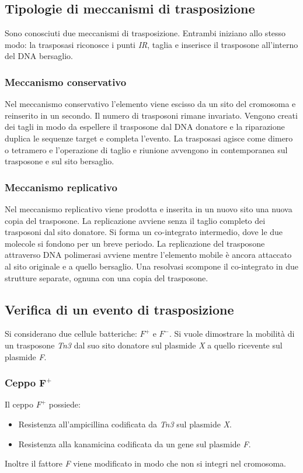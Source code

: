 	\subsection{Tipologie di meccanismi di trasposizione}
	Sono conosciuti due meccanismi di trasposizione.
	Entrambi iniziano allo stesso modo: la trasposasi riconosce i punti \emph{IR}, taglia e inserisce il trasposone all'interno del DNA bersaglio.

		\subsubsection{Meccanismo conservativo}
		Nel meccanismo conservativo l'elemento viene escisso da un sito del cromosoma e reinserito in un secondo.
		Il numero di trasposoni rimane invariato.
		Vengono creati dei tagli in modo da espellere il trasposone dal DNA donatore e la riparazione duplica le sequenze target e completa l'evento.
		La trasposasi agisce come dimero o tetramero e l'operazione di taglio e riunione avvengono in contemporanea sul trasposone e sul sito bersaglio.

		\subsubsection{Meccanismo replicativo}
		Nel meccanismo replicativo viene prodotta e inserita in un nuovo sito una nuova copia del trasposone.
		La replicazione avviene senza il taglio completo dei trasposoni dal sito donatore.
		Si forma un co-integrato intermedio, dove le due molecole si fondono per un breve periodo.
		La replicazione del trasposone attraverso DNA polimerasi avviene mentre l'elemento mobile \`e ancora attaccato al sito originale e a quello bersaglio.
		Una resolvasi scompone il co-integrato in due strutture separate, ognuna con una copia del trasposone.

		
	\subsection{Verifica di un evento di trasposizione}
	Si considerano due cellule batteriche: \emph{$F^+$} e \emph{$F^-$}. 
	Si vuole dimostrare la mobilità di un trasposone \emph{Tn3} dal suo sito donatore sul plasmide \emph{X} a quello ricevente sul plasmide \emph{F}.

		\subsubsection{Ceppo \emph{$\mathbf{F^+}$}}
		Il ceppo \emph{$F^+$} possiede:
		\begin{multicols}{2}
			\begin{itemize}
				\item Resistenza all'ampicillina codificata da \emph{Tn3} sul plasmide \emph{X}.
				\item Resistenza alla kanamicina codificata da un gene sul plasmide \emph{F}.
			\end{itemize}
		\end{multicols}
		Inoltre il fattore \emph{F} viene modificato in modo che non si integri nel cromosoma.

